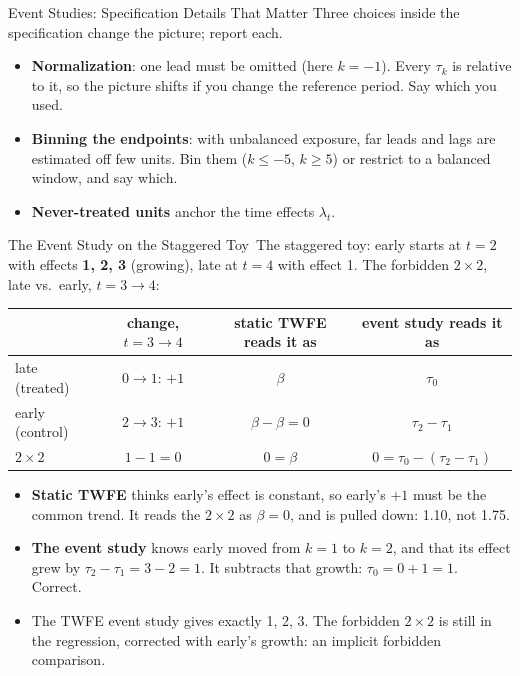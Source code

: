 \documentclass[aspectratio=169,11pt,xcolor=dvipsnames]{beamer}
\newcommand{\core}{\,\raisebox{0.6pt}{\textcolor{corestar}{$\bigstar$}}}
\begin{document}
\begin{frame}{Event Studies: Specification Details That Matter}
Three choices inside the specification change the picture; report each.
\vskip4pt
\begin{itemize}\itemsep3pt
  \item \textbf{Normalization}: one lead must be omitted (here $k=-1$). Every
        $\tau_k$ is relative to it, so the picture shifts if you change the
        reference period. Say which you used.
  \item \textbf{Binning the endpoints}: with unbalanced exposure, far leads and
        lags are estimated off few units. Bin them ($k \leq -5$, $k \geq 5$) or
        restrict to a balanced window, and say which.
  \item \textbf{Never-treated units} anchor the time effects $\lambda_t$.
\end{itemize}
\end{frame}

\begin{frame}{The Event Study on the Staggered Toy\core}
The staggered toy: early starts at $t = 2$ with effects \textbf{1, 2, 3} (growing), late at
$t = 4$ with effect 1. The forbidden $2\times2$, late vs.\ early, $t = 3 \to 4$:
\vskip2pt
\begin{center}\small
\renewcommand{\arraystretch}{1.15}
\begin{tabular}{@{}lccc@{}}
\toprule
 & change, $t = 3 \to 4$ & static TWFE reads it as & event study reads it as \\
\midrule
late (treated) & $0 \to 1$: $+1$ & $\beta$ & $\tau_0$ \\
early (control) & $2 \to 3$: $+1$ & $\beta - \beta = 0$ & $\tau_2 - \tau_1$ \\
\midrule
$2\times2$ & $1 - 1 = 0$ & $0 = \beta$ & $0 = \tau_0 - (\tau_2 - \tau_1)$ \\
\bottomrule
\end{tabular}
\end{center}
\vskip2pt
\begin{itemize}\itemsep3pt
  \item \textbf{Static TWFE} thinks early's effect is constant, so early's $+1$ must be the common
        trend. It reads the $2\times2$ as $\beta = 0$, and is pulled down: 1.10, not 1.75.
  \item \textbf{The event study} knows early moved from $k = 1$ to $k = 2$, and that its effect grew
        by $\tau_2 - \tau_1 = 3 - 2 = 1$. It subtracts that growth: $\tau_0 = 0 + 1 = 1$. Correct.
  \item The TWFE event study gives exactly 1, 2, 3. The forbidden $2\times2$ is still in the
        regression, corrected with early's growth: \alert{an implicit forbidden comparison}.
\end{itemize}
\end{frame}
\end{document}
